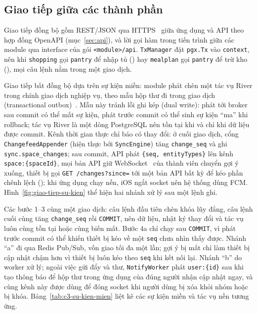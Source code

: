 \subsection{Giao tiếp giữa các thành phần}\label{ssec:giao-tiep}

Giao tiếp đồng bộ gồm REST/JSON qua HTTPS~\cite{rfc9110} giữa ứng dụng và API theo hợp đồng OpenAPI (mục~\ref{sec:api}), và lời gọi hàm trong tiến trình giữa các module qua interface của gói \texttt{<module>/api}. \texttt{TxManager} đặt \texttt{pgx.Tx} vào \texttt{context}, nên khi \texttt{shopping} gọi \texttt{pantry} để nhập tủ () hay \texttt{mealplan} gọi \texttt{pantry} để trừ kho (), mọi câu lệnh nằm trong một giao dịch.

Giao tiếp bất đồng bộ dựa trên sự kiện miền: module phát chèn một tác vụ River trong chính giao dịch nghiệp vụ, theo mẫu hộp thư đi trong giao dịch (transactional outbox)~\cite{richardson}. Mẫu này tránh lỗi ghi kép (dual write): phát tới broker sau commit có thể mất sự kiện, phát trước commit có thể sinh sự kiện “ma” khi rollback; tác vụ River là một dòng PostgreSQL nên tồn tại khi và chỉ khi dữ liệu được commit. Kênh thời gian thực chỉ báo có thay đổi: ở cuối giao dịch, cổng \texttt{ChangefeedAppender} (hiện thực bởi \texttt{SyncEngine}) tăng \texttt{change\_seq} và ghi \texttt{sync.space\_changes}; sau commit, API phát \texttt{\{seq, entityTypes\}} lên kênh \texttt{space:\{spaceId\}}, mọi bản API giữ WebSocket~\cite{rfc6455} của thành viên chuyển gợi ý xuống, thiết bị gọi \texttt{GET /changes?since=} tới một bản API bất kỳ để kéo phần chênh lệch (); khi ứng dụng chạy nền, iOS ngắt socket nên hệ thống dùng FCM. Hình~\ref{fig:giao-tiep-su-kien} thể hiện hai nhánh xử lý sau một lệnh ghi.


Các bước 1–3 cùng một giao dịch: câu lệnh đầu tiên chèn khóa lũy đẳng, câu lệnh cuối cùng tăng \texttt{change\_seq} rồi \texttt{COMMIT}, nên dữ liệu, nhật ký thay đổi và tác vụ luôn cùng tồn tại hoặc cùng biến mất. Bước 4a chỉ chạy sau \texttt{COMMIT}, vì phát trước commit có thể khiến thiết bị kéo về một \texttt{seq} chưa nhìn thấy được. Nhánh “a” đi qua Redis Pub/Sub, vốn giao tối đa một lần; gợi ý bị mất chỉ làm thiết bị cập nhật chậm hơn vì thiết bị luôn kéo theo \texttt{seq} khi kết nối lại. Nhánh “b” do worker xử lý; ngoài việc gửi đẩy và thư, \texttt{NotifyWorker} phát \texttt{user:\{id\}} sau khi tạo thông báo để hộp thư trong ứng dụng của đúng người nhận cập nhật ngay, và cùng kênh này được dùng để đóng socket khi người dùng bị xóa khỏi nhóm hoặc bị khóa. Bảng~\ref{tab:c3-su-kien-mien} liệt kê các sự kiện miền và tác vụ nền tương ứng.

